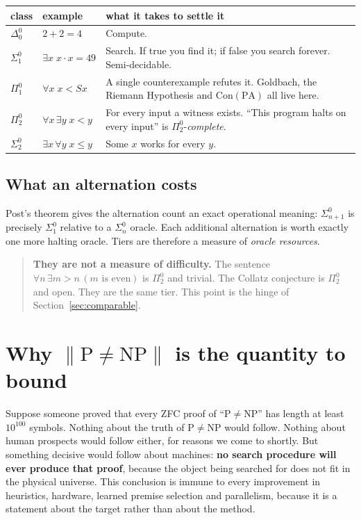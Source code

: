 \documentclass[11pt,a4paper]{article}
\newcommand{\Sig}[2]{\Sigma^{#1}_{#2}}
\newcommand{\Pai}[2]{\Pi^{#1}_{#2}}
\newcommand{\Del}[2]{\Delta^{#1}_{#2}}
\newcommand{\shortest}[1]{\left\lVert #1 \right\rVert}
\begin{document}
\begin{center}
\begin{tabular}{@{}llp{7.2cm}@{}}
\toprule
class & example & what it takes to settle it \\
\midrule
$\Del{0}{0}$ & $2+2 = 4$ & Compute. \\
$\Sig{0}{1}$ & $\exists x\; x\cdot x = 49$ & Search. If true you find it; if false you search forever. Semi-decidable. \\
$\Pai{0}{1}$ & $\forall x\; x < Sx$ & A single counterexample refutes it. Goldbach, the Riemann Hypothesis and $\mathrm{Con}(\mathrm{PA})$ all live here. \\
$\Pai{0}{2}$ & $\forall x\, \exists y\; x < y$ & For every input a witness exists. ``This program halts on every input'' is $\Pai{0}{2}$-\emph{complete}. \\
$\Sig{0}{2}$ & $\exists x\, \forall y\; x \le y$ & Some $x$ works for every $y$. \\
\bottomrule
\end{tabular}
\end{center}

\subsection*{What an alternation costs}

Post's theorem gives the alternation count an exact operational meaning:
$\Sig{0}{n+1}$ is precisely $\Sig{0}{1}$ relative to a $\Sig{0}{n}$ oracle.
Each additional alternation is worth exactly one more halting oracle. Tiers
are therefore a measure of \emph{oracle resources}.

\begin{quote}
\textbf{They are not a measure of difficulty.} The sentence
$\forall n\, \exists m > n\, (m \text{ is even})$ is $\Pai{0}{2}$ and
trivial. The Collatz conjecture is $\Pai{0}{2}$ and open. They are the same
tier. This point is the hinge of Section~\ref{sec:comparable}.
\end{quote}

\section{Why $\shortest{\mathrm{P} \neq \mathrm{NP}}$ is the quantity to bound}

Suppose someone proved that every ZFC proof of ``$\mathrm{P} \neq
\mathrm{NP}$'' has length at least $10^{100}$ symbols. Nothing about the truth
of $\mathrm{P} \neq \mathrm{NP}$ would follow. Nothing about human prospects
would follow either, for reasons we come to shortly. But something decisive
would follow about machines: \textbf{no search procedure will ever produce
that proof}, because the object being searched for does not fit in the
physical universe. This conclusion is immune to every improvement in
heuristics, hardware, learned premise selection and parallelism, because it is
a statement about the target rather than about the method.
\end{document}
